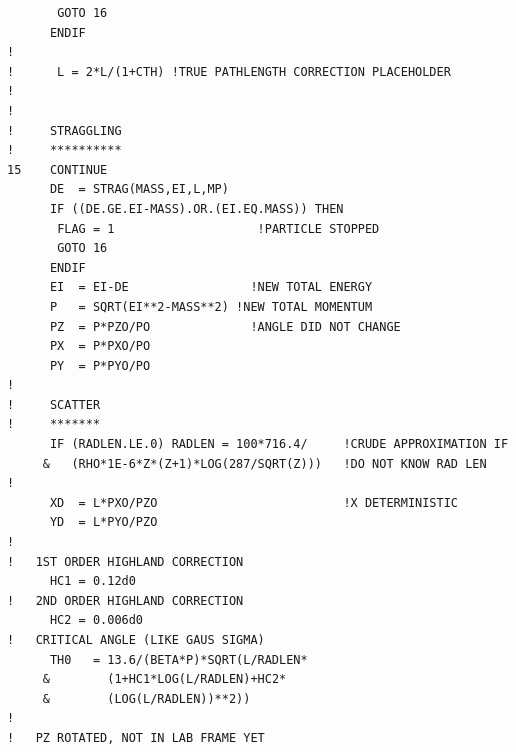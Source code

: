 \begin{lstlisting}
       GOTO 16
      ENDIF
!
!      L = 2*L/(1+CTH) !TRUE PATHLENGTH CORRECTION PLACEHOLDER
!
!
!     STRAGGLING
!     **********
15    CONTINUE
      DE  = STRAG(MASS,EI,L,MP)
      IF ((DE.GE.EI-MASS).OR.(EI.EQ.MASS)) THEN
       FLAG = 1                    !PARTICLE STOPPED
       GOTO 16
      ENDIF
      EI  = EI-DE                 !NEW TOTAL ENERGY
      P   = SQRT(EI**2-MASS**2) !NEW TOTAL MOMENTUM
      PZ  = P*PZO/PO              !ANGLE DID NOT CHANGE
      PX  = P*PXO/PO
      PY  = P*PYO/PO
!
!     SCATTER
!     *******
      IF (RADLEN.LE.0) RADLEN = 100*716.4/     !CRUDE APPROXIMATION IF
     &   (RHO*1E-6*Z*(Z+1)*LOG(287/SQRT(Z)))   !DO NOT KNOW RAD LEN
!
      XD  = L*PXO/PZO                          !X DETERMINISTIC
      YD  = L*PYO/PZO
!
!   1ST ORDER HIGHLAND CORRECTION
      HC1 = 0.12d0
!   2ND ORDER HIGHLAND CORRECTION
      HC2 = 0.006d0
!   CRITICAL ANGLE (LIKE GAUS SIGMA)
      TH0   = 13.6/(BETA*P)*SQRT(L/RADLEN*
     &        (1+HC1*LOG(L/RADLEN)+HC2*
     &        (LOG(L/RADLEN))**2))
!
!   PZ ROTATED, NOT IN LAB FRAME YET
\end{lstlisting}
\label{pg:scatdist}
